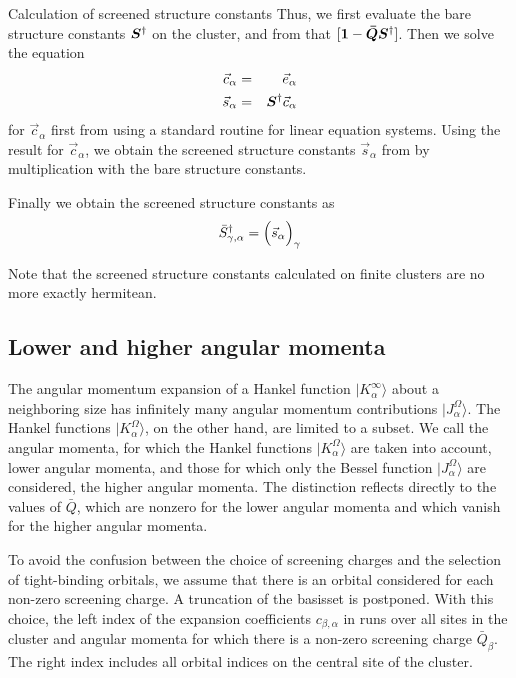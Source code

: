 \documentclass[11pt,a4paper]{report}
\begin{document}
\begin{myshadowminipage}{Calculation of screened structure constants}
Thus, we first evaluate the bare structure constants $\bm{S}^\dagger$
on the cluster, and from that
$[\bm{1}-\bm{\bar{Q}}\bm{S}^\dagger]$. Then we solve the equation
\begin{eqnarray}
[\mat{1}-\mat{\bar{Q}}\mat{S}^\dagger]\vec{c}_\alpha&=&\vec{e}_\alpha
\label{eq:forscreenedsa}
\\
\vec{s}_\alpha&=&\mat{S}^\dagger\vec{c}_\alpha
\label{eq:forscreenedsb}
\end{eqnarray}
for $\vec{c}_\alpha$ first from  using a standard
routine for linear equation systems. Using the result for
$\vec{c}_\alpha$, we obtain the screened structure constants
$\vec{s}_\alpha$ from  by multiplication with the
bare structure constants.

Finally we obtain the screened structure constants as
\begin{eqnarray}
\bar{S}^\dagger_{\gamma,\alpha}=\Bigl(\vec{s}_\alpha\Bigr)_\gamma
\end{eqnarray}
\end{myshadowminipage}

Note that the screened structure constants calculated on finite
clusters are no more exactly hermitean.

\subsection{Lower and higher angular momenta}
The angular momentum expansion of a Hankel function
$|K^\infty_\alpha\rangle$ about a neighboring size has infinitely many
angular momentum contributions $|J^\Omega_\alpha\rangle$. The Hankel
functions $|K^\Omega_\alpha\rangle$, on the other hand, are limited to
a subset. We call the angular momenta, for which the Hankel functions
$|K^\Omega_\alpha\rangle$ are taken into account, lower angular
momenta, and those for which only the Bessel function
$|J^\Omega_\alpha\rangle$ are considered, the higher angular momenta.
The distinction reflects directly to the values of $\bar{Q}$, which
are nonzero for the lower angular momenta and which vanish for the
higher angular momenta. 

To avoid the confusion between the choice of screening charges and the
selection of tight-binding orbitals, we assume that there is an
orbital considered for each non-zero screening charge. A truncation of
the basisset is postponed.  With this choice, the left index of the
expansion coefficients $c_{\beta,\alpha}$ in
 runs over all sites in the cluster and
angular momenta for which there is a non-zero screening charge
$\bar{Q}_\beta$. The right index includes all orbital indices on the
central site of the cluster.
\end{document}
